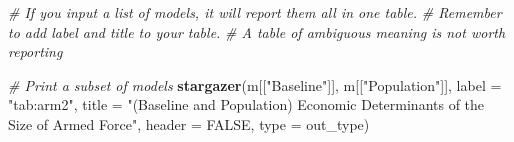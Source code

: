 \documentclass[11pt,]{article}
\newenvironment{Shaded}{\begin{snugshade}}{\end{snugshade}}
\newcommand{\KeywordTok}[1]{\textcolor[rgb]{0.13,0.29,0.53}{\textbf{#1}}}
\newcommand{\DataTypeTok}[1]{\textcolor[rgb]{0.13,0.29,0.53}{#1}}
\newcommand{\StringTok}[1]{\textcolor[rgb]{0.31,0.60,0.02}{#1}}
\newcommand{\CommentTok}[1]{\textcolor[rgb]{0.56,0.35,0.01}{\textit{#1}}}
\newcommand{\OtherTok}[1]{\textcolor[rgb]{0.56,0.35,0.01}{#1}}
\newcommand{\NormalTok}[1]{#1}
\begin{document}
\begin{Shaded}
\begin{Highlighting}[]
      \CommentTok{# If you input a list of models, it will report them all in one table.}
      \CommentTok{# Remember to add label and title to your table. }
      \CommentTok{# A table of ambiguous meaning is not worth reporting}

  \CommentTok{# Print a subset of models}
    \KeywordTok{stargazer}\NormalTok{(m[[}\StringTok{"Baseline"}\NormalTok{]], m[[}\StringTok{"Population"}\NormalTok{]], }\DataTypeTok{label =} \StringTok{"tab:arm2"}\NormalTok{, }
              \DataTypeTok{title =} 
                \StringTok{"(Baseline and Population) Economic Determinants of the Size of Armed Force"}\NormalTok{,}
              \DataTypeTok{header =} \OtherTok{FALSE}\NormalTok{, }\DataTypeTok{type =}\NormalTok{ out_type)}
\end{Highlighting}
\end{Shaded}
\end{document}
